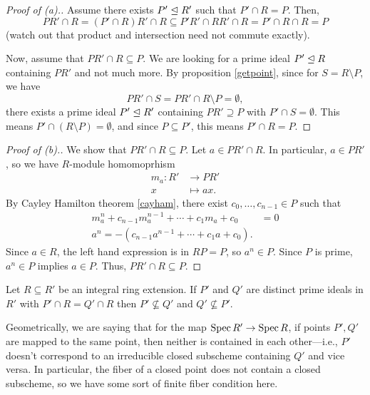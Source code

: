\documentclass[12pt]{article}
\begin{document}
\begin{proof}[Proof of (a).]
    Assume there exists $P' \trianglelefteq R'$ such that $P'\cap R = P$. Then,
    \[PR' \cap R = (P'\cap R)R' \cap R \subseteq P'R' \cap RR' \cap R = P' \cap R \cap R = P\]
    (watch out that product and intersection need not commute exactly).
    
    Now, assume that $PR'\cap R \subseteq P$. We are looking for a prime ideal $P'\trianglelefteq R$ containing $PR'$ and not much more. By proposition \ref{getpoint}, since for $S=R\setminus P$, we have
    \[PR' \cap S = PR'\cap R\setminus P = \emptyset,\]
    there exists a prime ideal $P'\trianglelefteq R'$ containing $PR'\supseteq P$ with $P' \cap S = \emptyset$. This means $P'\cap (R\setminus P) = \emptyset$, and since $P\subseteq P'$, this means $P'\cap R = P$.
\end{proof}

\begin{proof}[Proof of (b).]
    We show that $PR' \cap R \subseteq P$. Let $a\in PR' \cap R$. In particular, $a\in PR'$, so we have $R$-module homomoprhism
    \begin{align*}
        m_a: R' &\longrightarrow PR'\\
        x &\longmapsto ax.
    \end{align*}
    By Cayley Hamilton theorem \ref{cayham}, there exist $c_0,\dots,c_{n-1} \in P$ such that
    \begin{align*}
        m_a^n + c_{n-1}m_a^{n-1} + \cdots + c_1m_a + c_0 &= 0\\
        a^n = -(c_{n-1}a^{n-1} + \cdots + c_1 a + c_0).
    \end{align*}
    Since $a\in R$, the left hand expression is in $RP=P$, so $a^n\in P$. Since $P$ is prime, $a^n\in P$ implies $a\in P$. Thus, $PR' \cap R\subseteq P$.
\end{proof}

\begin{prop}[Incomparability]\label{incomp}
    Let $R\subseteq R'$ be an integral ring extension. If $P'$ and $Q'$ are distinct prime ideals in $R'$ with $P'\cap R= Q' \cap R$ then $P'\not\subseteq Q'$ and $Q'\not\subseteq P'$.
\end{prop}

Geometrically, we are saying that for the map $\operatorname{Spec} R' \to \operatorname{Spec} R$, if points $P',Q'$ are mapped to the same point, then neither is contained in each other---i.e., $P'$ doesn't correspond to an irreducible closed subscheme containing $Q'$ and vice versa. In particular, the fiber of a closed point does not contain a closed subscheme, so we have some sort of finite fiber condition here.
\end{document}
